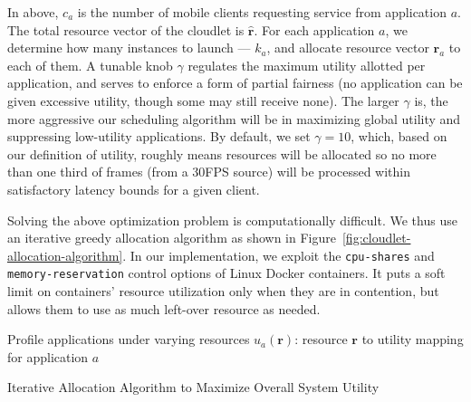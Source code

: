 In above, $c_a$ is the number of mobile clients requesting service from application $a$.
The total resource vector of the cloudlet is  $\hat{\mathbf{r}}$.
For each application $a$, we determine how many instances to launch --- $k_a$, and
allocate resource vector $\mathbf{r}_a$ to each of them.
A tunable knob $\gamma$ regulates the maximum utility allotted
per application, and serves to enforce a form of partial fairness (no application
can be given excessive utility, though some may still receive none).
The larger $\gamma$ is, the more aggressive our scheduling algorithm
will be in maximizing global utility and
suppressing low-utility applications.
By default, we set $\gamma=10$, which, based on our definition of
utility, roughly means resources will be allocated so
no more than one third of frames (from a 30FPS source)
will be processed within satisfactory latency bounds for a given
client.

Solving the above optimization problem is computationally difficult. We thus use
an iterative greedy allocation algorithm as shown in
Figure~\ref{fig:cloudlet-allocation-algorithm}. In our implementation, we
exploit the \texttt{cpu-shares} and \texttt{memory-reservation} control options
of Linux Docker containers. It puts a soft limit on containers' resource
utilization only when they are in contention, but allows them to use as much
left-over resource as needed.

\begin{algorithm}[]
  \SetAlgoLined
  Profile applications under varying resources\;
  $u_a(\mathbf{r})$: resource $\mathbf{r}$ to utility mapping for application
  $a$\;
  \caption{Iterative Allocation Algorithm to Maximize Overall System Utility}
  \label{fig:cloudlet-allocation-algorithm}
\end{algorithm}

